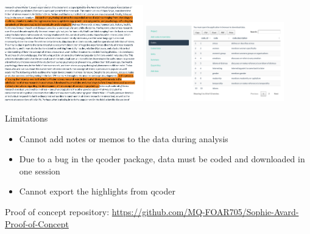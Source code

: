 \documentclass[unknownkeysallowed,usepdftitle=false, parskip=full]{beamer}
\newcommand{\secvariable}{nothing}
\begin{document}
\begin{frame}\label{\secvariable}

%
\includegraphics[width=0.45\textwidth,height=1\textheight,keepaspectratio]{figure4.png}\hspace{.05\textwidth}
\includegraphics[width=0.45\textwidth,height=1\textheight,keepaspectratio]{figure11.png}

Limitations
\begin{itemize}
    \item Cannot add notes or memos to the data during analysis
    \item Due to a bug in the qcoder package, data must be coded and downloaded in one session
    \item Cannot export the highlights from qcoder
\end{itemize}

\end{frame}
\begin{frame}

Proof of concept repository: \href{https://github.com/MQ-FOAR705/Sophie-Avard-Proof-of-Concept}{https://github.com/MQ-FOAR705/Sophie-Avard-Proof-of-Concept}

    
\end{frame}
\end{document}
